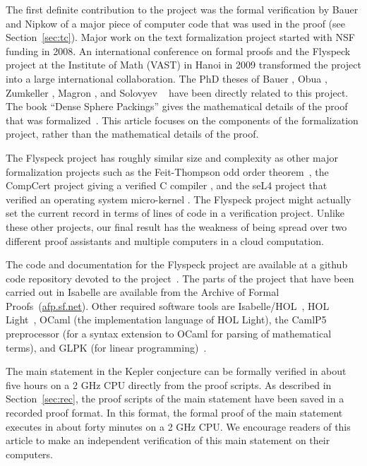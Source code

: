 The first definite contribution to the project was the formal
verification by Bauer and Nipkow of a major piece of computer code
that was used in the proof (see Section~\ref{sec:tc}).  Major work on
the text formalization project started with NSF funding in 2008.  An
international conference on formal proofs and the Flyspeck project
at the Institute of Math (VAST) in Hanoi in 2009 transformed the project
into a large international collaboration.  The PhD theses of Bauer
\cite{Bauer:2006:Thesis}, Obua \cite{Obua:2005:Thesis}, Zumkeller
\cite{roland-thesis}, Magron \cite{Magron:3013:Thesis}, and
Solovyev ~\cite{Solovyev-thesis} have been directly related to this
project.  The book ``Dense Sphere Packings'' gives the mathematical
details of the proof that was formalized~\cite{DSP}.  This article
focuses on the components of the formalization project, rather than
the mathematical details of the proof.

The Flyspeck project has roughly similar size and complexity as other
major formalization projects such as the Feit-Thompson odd order
theorem~\cite{gonthier2013machine}, the CompCert project giving a
verified C compiler \cite{CC}, and the seL4 project that verified an
operating system micro-kernel \cite{Klein-SOSP09}.  The Flyspeck
project might actually set the current record in terms of lines of
code in a verification project.  Unlike these other projects, our
final result has the weakness of being spread over two different proof
assistants and multiple computers in a cloud computation.

The code and documentation for the Flyspeck project are available at a
github code repository devoted to the
project~\cite{website:FlyspeckProject}.  The parts of the project that
have been carried out in Isabelle are available from the Archive of
Formal Proofs~(\url{afp.sf.net}).  Other required software tools are
Isabelle/HOL~\cite{LNCS2283}, HOL Light~\cite{HOLL}, OCaml (the
implementation language of HOL Light), the CamlP5 preprocessor (for a
syntax extension to OCaml for parsing of mathematical terms), and GLPK
(for linear programming)~\cite{website:GLPK}.


The main statement in the Kepler conjecture can be formally verified
in about five hours on a 2 GHz CPU directly from the proof scripts.
As described in Section~\ref{sec:rec}, the proof scripts of the main
statement have been saved in a recorded proof format.  In this format,
the formal proof of the main statement executes in about forty minutes on a
2 GHz CPU.  We encourage readers of this article to make an
independent verification of this main statement on their computers.

